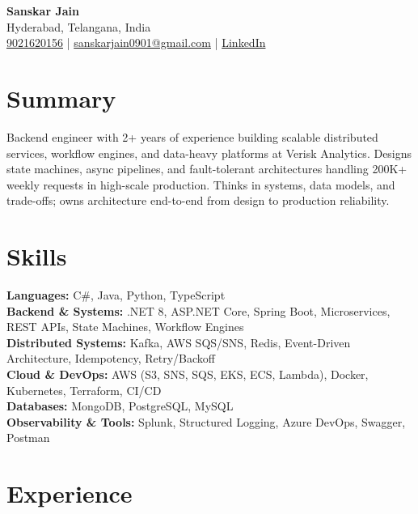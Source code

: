 \documentclass[a4paper,10pt]{article}
\begin{document}
\begin{center}
    {\LARGE \textbf{Sanskar Jain}} \\
    Hyderabad, Telangana, India \\
    \href{tel:9021620156}{9021620156} \;|\;
    \href{mailto:sanskarjain0901@gmail.com}{sanskarjain0901@gmail.com} \;|\;
    \href{https://www.linkedin.com/in/sanskar-jain0901/}{LinkedIn}
\end{center}

\vspace{3pt}

\section*{Summary}
Backend engineer with 2+ years of experience building scalable distributed services, workflow engines, and data-heavy platforms at Verisk Analytics.
Designs state machines, async pipelines, and fault-tolerant architectures handling 200K+ weekly requests in high-scale production.
Thinks in systems, data models, and trade-offs; owns architecture end-to-end from design to production reliability.

\section*{Skills}
\textbf{Languages:} C\#, Java, Python, TypeScript \\
\textbf{Backend \& Systems:} .NET 8, ASP.NET Core, Spring Boot, Microservices, REST APIs, State Machines, Workflow Engines \\
\textbf{Distributed Systems:} Kafka, AWS SQS/SNS, Redis, Event-Driven Architecture, Idempotency, Retry/Backoff \\
\textbf{Cloud \& DevOps:} AWS (S3, SNS, SQS, EKS, ECS, Lambda), Docker, Kubernetes, Terraform, CI/CD \\
\textbf{Databases:} MongoDB, PostgreSQL, MySQL \\
\textbf{Observability \& Tools:} Splunk, Structured Logging, Azure DevOps, Swagger, Postman

\section*{Experience}
\end{document}

